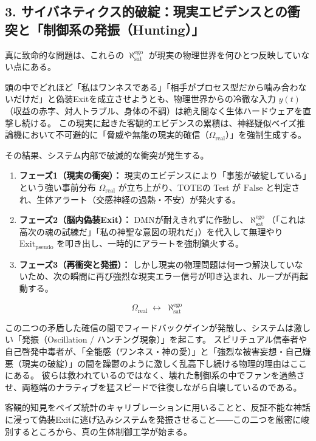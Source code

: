 \subsection*{3. サイバネティクス的破綻：現実エビデンスとの衝突と「制御系の発振（Hunting）」}
真に致命的な問題は、これらの $\aleph^{\mathrm{ego}}_{\mathrm{sat}}$ が現実の物理世界を何ひとつ反映していない点にある。

頭の中でどれほど「私はワンネスである」「相手がプロセス型だから噛み合わないだけだ」と偽装Exitを成立させようとも、物理世界からの冷徹な入力 $y(t)$（収益の赤字、対人トラブル、身体の不調）は絶え間なく生体ハードウェアを直撃し続ける。
この現実に起きた客観的エビデンスの累積は、神経疑似ベイズ推論機において不可避的に「脅威や無能の現実的確信（$\Omega_{\mathrm{real}}$）」を強制生成する。

その結果、システム内部で破滅的な衝突が発生する。

\begin{enumerate}
\item \textbf{フェーズ1（現実の衝突）：} 現実のエビデンスにより「事態が破綻している」という強い事前分布 $\Omega_{\mathrm{real}}$ が立ち上がり、TOTEの Test が $\mathrm{False}$ と判定され、生体アラート（交感神経の過熱・不安）が発火する。
\item \textbf{フェーズ2（脳内偽装Exit）：} DMNが耐えきれずに作動し、$\aleph^{\mathrm{ego}}_{\mathrm{sat}}$（「これは高次の魂の試練だ」「私の神聖な意図の現れだ」）を代入して無理やり $\mathrm{Exit}_{\mathrm{pseudo}}$ を叩き出し、一時的にアラートを強制鎮火する。
\item \textbf{フェーズ3（再衝突と発振）：} しかし現実の物理問題は何一つ解決していないため、次の瞬間に再び強烈な現実エラー信号が叩き込まれ、ループが再起動する。
\end{enumerate}

$$\Omega_{\mathrm{real}} \;\longleftrightarrow\; \aleph^{\mathrm{ego}}_{\mathrm{sat}}$$

この二つの矛盾した確信の間でフィードバックゲインが発散し、システムは激しい「発振（Oscillation / ハンチング現象）」を起こす。
スピリチュアル信奉者や自己啓発中毒者が、「全能感（ワンネス・神の愛）」と「強烈な被害妄想・自己嫌悪（現実の破綻）」の間を躁鬱のように激しく乱高下し続ける物理的理由はここにある。
彼らは救われているのではなく、壊れた制御系の中でファンを過熱させ、両極端のナラティブを猛スピードで往復しながら自壊しているのである。

客観的知見をベイズ統計のキャリブレーションに用いることと、反証不能な神話に浸って偽装Exitに逃げ込みシステムを発振させること――この二つを厳密に峻別するところから、真の生体制御工学が始まる。

